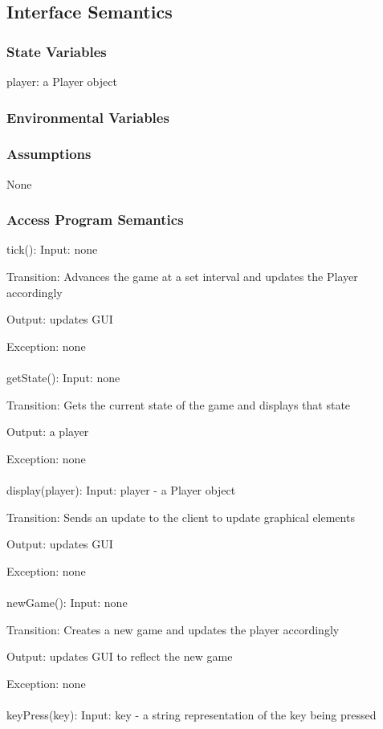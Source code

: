 \documentclass[12,english]{article}
\begin{document}
		\subsection{Interface Semantics}
			\subsubsection{State Variables}
			player: a Player object
			\subsubsection{Environmental Variables}
			\subsubsection{Assumptions}
			None
			\subsubsection{Access Program Semantics}
			
			tick():
			Input: none
			
			Transition: Advances the game at a set interval and updates the Player accordingly
		
			Output: updates GUI
			
			Exception: none\\
			\\	
			getState():
			Input: none
			
			Transition: Gets the current state of the game and displays that state
		
			Output: a player
			
			Exception: none\\
			\\	
			display(player):
			Input: player - a Player object
			
			Transition: Sends an update to the client to update graphical elements
		
			Output: updates GUI
			
			Exception: none\\
			\\	
			newGame():
			Input: none
			
			Transition: Creates a new game and updates the player accordingly
		
			Output: updates GUI to reflect the new game
			
			Exception: none\\
			\\	
			keyPress(key):
			Input: key - a string representation of the key being pressed
			
\end{document}
